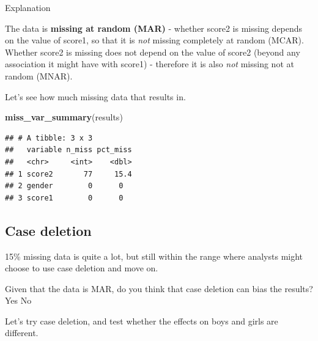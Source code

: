 \documentclass[
]{book}
\newenvironment{Shaded}{\begin{snugshade}}{\end{snugshade}}
\newcommand{\CommentTok}[1]{\textcolor[rgb]{0.56,0.35,0.01}{\textit{#1}}}
\newcommand{\DataTypeTok}[1]{\textcolor[rgb]{0.13,0.29,0.53}{#1}}
\newcommand{\KeywordTok}[1]{\textcolor[rgb]{0.13,0.29,0.53}{\textbf{#1}}}
\newcommand{\NormalTok}[1]{#1}
\newcommand{\OperatorTok}[1]{\textcolor[rgb]{0.81,0.36,0.00}{\textbf{#1}}}
\newcommand{\StringTok}[1]{\textcolor[rgb]{0.31,0.60,0.02}{#1}}
\begin{document}
Explanation

The data is \textbf{missing at random (MAR)} - whether score2 is missing depends on the value of score1, so that it is \emph{not} missing completely at random (MCAR). Whether score2 is missing does not depend on the value of score2 (beyond any association it might have with score1) - therefore it is also \emph{not} missing not at random (MNAR).

Let's see how much missing data that results in.

\begin{Shaded}
\begin{Highlighting}[]
\KeywordTok{miss_var_summary}\NormalTok{(results)}
\end{Highlighting}
\end{Shaded}

\begin{verbatim}
## # A tibble: 3 x 3
##   variable n_miss pct_miss
##   <chr>     <int>    <dbl>
## 1 score2       77     15.4
## 2 gender        0      0  
## 3 score1        0      0
\end{verbatim}

\hypertarget{case-deletion}{%
\subsection{Case deletion}\label{case-deletion}}

15\% missing data is quite a lot, but still within the range where analysts might choose to use case deletion and move on.

Given that the data is MAR, do you think that case deletion can bias the results? Yes No

Let's try case deletion, and test whether the effects on boys and girls are different.

\begin{Shaded}
\end{Shaded}
\end{document}
